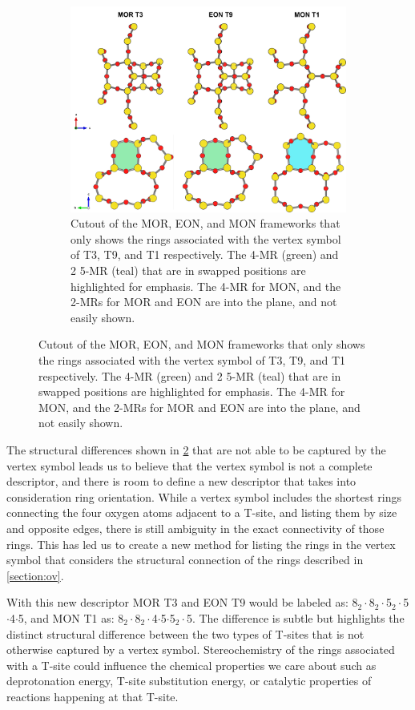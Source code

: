 \documentclass[preprint,numrefs,noinfo,sort&compress]{elsarticle}
\begin{document}
\begin{figure}
\begin{figure}[H]
\centering
\includegraphics[width=\textwidth]{figures/chapter-3/stereo.pdf}
\caption{Cutout of the MOR, EON, and MON frameworks that only shows the rings associated with the vertex symbol of T3, T9, and T1 respectively. The 4-MR (green) and 2\texttimes{} 5-MR (teal) that are in swapped positions are highlighted for emphasis. The 4-MR for MON, and the 2-MRs for MOR and EON are into the plane, and not easily shown. \label{fig:stereo}}
\end{figure}
\end{figure}

The structural differences shown in \cref{fig:stereo} that are not able to be captured by the vertex symbol leads us to believe that the vertex symbol is not a complete descriptor, and there is room to define a new descriptor that takes into consideration ring orientation. While a vertex symbol includes the shortest rings connecting the four oxygen atoms adjacent to a T-site, and listing them by size and opposite edges, there is still ambiguity in the exact connectivity of those rings. This has led us to create a new method for listing the rings in the vertex symbol that considers the structural connection of the rings described in \cref{section:ov}. 

With this new descriptor MOR T3 and EON T9 would be labeled as: 8\(_{\text{2}} \cdot\)8\(_{\text{2}} \cdot\)5\(_{\text{2}} \cdot\)5\(\cdot\)4\(\cdot\)5, and MON T1 as: 8\(_{\text{2}} \cdot\)8\(_{\text{2}} \cdot\)4\(\cdot\)5\(\cdot\)5\(_{\text{2}} \cdot\)5. The difference is subtle but highlights the distinct structural difference between the two types of T-sites that is not otherwise captured by a vertex symbol. Stereochemistry of the rings associated with a T-site could influence the chemical properties we care about such as deprotonation energy, T-site substitution energy, or catalytic properties of reactions happening at that T-site.
\end{document}
